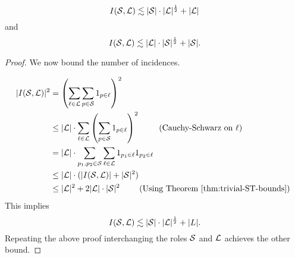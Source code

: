 \begin{theorem}
    $$I(\mathcal S,\mathcal L) \lesssim |\mathcal S|\cdot |\mathcal L|^{\frac{1}{2}} + |\mathcal L|$$
    and
    $$I(\mathcal S,\mathcal L) \lesssim |\mathcal L|\cdot |\mathcal S|^{\frac{1}{2}} + |\mathcal S|.$$
    \label{thm:pretty-trivial-ST-bounds}
\end{theorem}
\begin{proof}
    


We now bound the number of incidences. 

\begin{align*}
    |I(\mathcal S,\mathcal L)|^2 &= \left( \sum_{\ell \in \mathcal L} \sum_{p \in \mathcal S} 1_{p\in \ell} \right)^2 \\
    & \leq |\mathcal L|\cdot \sum_{\ell \in \mathcal L} \left( \sum_{p \in \mathcal S} 1_{p\in \ell} \right)^2  \qquad \text{ (Cauchy-Schwarz on $\ell$)}\\
    &= |\mathcal L|\cdot \sum_{p_1,p_2 \in \mathcal S} \sum_{\ell \in \mathcal L}   1_{p_1\in \ell} 1_{p_2\in \ell}    \\
    & \leq |\mathcal L|\cdot ( |I(\mathcal S,\mathcal L)| + |\mathcal S|^2)\\ 
    &\leq |\mathcal L|^2 + 2|\mathcal L|\cdot |\mathcal S|^2 \qquad \text{ (Using Theorem \ref{thm:trivial-ST-bounds}) }\\ 
\end{align*}    
This implies
$$I(\mathcal S,\mathcal L) \lesssim |\mathcal S|\cdot |\mathcal L|^{\frac{1}{2}} + |L|.$$ 
Repeating the above proof interchanging the roles $\mathcal S$ and $\mathcal L$ achieves the other bound.
\end{proof}



